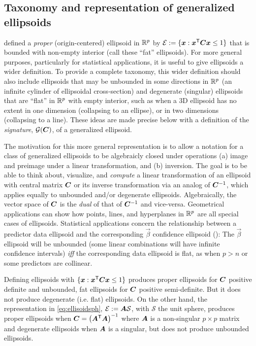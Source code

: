 \subsection{Taxonomy and representation of generalized ellipsoids}\label{sec:taxonomy}
 defined a \emph{proper} (origin-centered) ellipsoid in  $\mathbb{R}^{p}$ by
$\mathcal{E} := \{ \bm{x}: \bm{x}^\mathsf{T} \bm{C} \bm{x} \le 1 \}$ that is bounded with non-empty interior (call these ``fat'' ellipsoids).
For more general purposes, particularly for statistical applications,
it is useful to give ellipsoids a wider definition.
To provide a complete taxonomy, this wider definition should also include ellipsoids that may be unbounded in some directions in $\mathbb{R}^{p}$
(an infinite cylinder of ellipsoidal cross-section) and
degenerate (singular) ellipsoids that are ``flat'' in  $\mathbb{R}^{p}$ with empty interior, such as when a 3D ellipsoid has no extent in
one dimension (collapsing to an ellipse), or in two dimensions (collapsing to a line).  These ideas are made precise below
with a definition of the \emph{signature}, $\mathcal{G}(\bm{C})$, of a generalized ellipsoid.

The motivation for this more general representation is to allow a notation for a class of generalized ellipsoids to be
algebraicly closed under operations (a) image and preimage under a linear transformation, and (b) inversion.
The goal is to be able to think about, visualize, and \emph{compute} a linear transformation of an ellipsoid with central matrix
$\bm{C}$ or its inverse transformation via an analog of $\bm{C}^{-1}$, which applies equally to unbounded
and/or degenerate ellipsoids. 
Algebraically, the vector space of $\bm{C}$ is the \emph{dual} of that of $\bm{C}^{-1}$ 
\citep[Ch. 6]{Dempster:69}
and vice-versa.
Geometrical applications can show how points, lines, and hyperplanes 
in  $\mathbb{R}^{p}$ are all special cases of ellipsoids.
Statistical applications concern the relationship between a predictor data ellipsoid and the
corresponding $\vec{\beta}$ confidence ellipsoid (): The $\vec{\beta}$ ellipsoid will be unbounded (some linear combinations
will have infinite confidence intervals) \emph{iff} the corresponding data ellipsoid is flat, as when $p>n$ or some predictors are collinear.

Defining ellipsoids with $\{ \bm{x}: \bm{x}^\mathsf{T} \bm{C} \bm{x} \le 1 \}$ produces proper ellipsoids for $\bm{C}$
positive definite and unbounded, fat ellipsoids for $\bm{C}$ positive semi-definite.
But it does not produce degenerate (i.e. flat) ellipsoids.  On the other hand,
the representation in \eqref{eq:ellisoidsph},
$\mathcal{E} := \bm{A} \mathcal{S}$, with $\mathcal{S}$ the unit sphere,
 produces proper ellipsoids when $\bm{C} = \left( \bm{A} ^\mathsf{T} \bm{A} \right)^{-1}$
where $\bm{A}$ is a non-singular $p \times p$ matrix and degenerate ellipsoids when $\bm{A}$ is a singular, but does not
produce unbounded ellipsoids.

